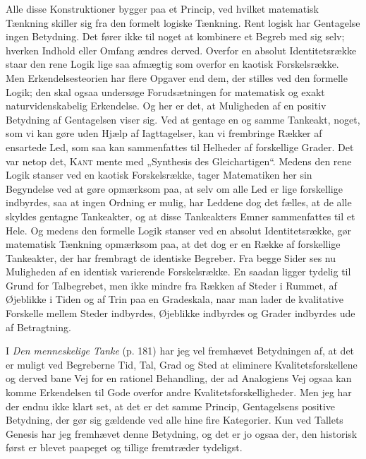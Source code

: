 \documentclass[12pt]{article}
\newcommand{\opage}[1]{\marginnote{\footnotesize\textit{[#1]}}}
\begin{document}
Alle disse Konstruktioner bygger paa et Princip, ved hvilket matematisk
Tænkning skiller sig fra den formelt logiske Tænkning. Rent logisk har
Gentagelse ingen Betydning. Det fører ikke til noget at kombinere et Begreb med
sig selv; hverken Indhold eller Omfang ændres derved. Overfor en absolut
Identitetsrække staar den rene Logik lige saa afmægtig som overfor en kaotisk
Forskelsrække. Men Erkendelsesteorien har flere Opgaver end dem, der stilles ved
den formelle Logik; den skal ogsaa undersøge Forudsætningen for matematisk og
exakt naturvidenskabelig Erkendelse. Og her er det, at Muligheden af en positiv
Betydning af Gentagelsen viser sig. Ved at gentage en og samme Tankeakt, noget,
som vi kan gøre uden Hjælp af Iagttagelser, kan vi frembringe Rækker af
ensartede Led, som saa kan sammenfattes til Helheder af forskellige Grader. Det
var netop det, \textsc{Kant} mente med „Synthesis des Gleichartigen“. Medens
den rene Logik stanser ved en kaotisk Forskelsrække, tager Matematiken her sin
Begyndelse ved at gøre opmærksom paa, at selv om alle Led er lige forskellige
indbyrdes, saa at ingen Ordning er mulig, har Leddene dog det fælles, at de
alle skyldes gentagne Tankeakter, og at disse Tankeakters Emner sammenfattes
til et Hele. Og medens den formelle Logik stanser ved en absolut
Identitetsrække, gør matematisk Tænkning opmærksom paa, at det dog er en Række
af forskellige Tankeakter, der har frembragt de identiske Begreber. Fra begge
Sider ses nu Muligheden af en identisk varierende Forskelsrække. En saadan
ligger tydelig til Grund for Talbegrebet, men ikke
\setcounter{footnote}{0}%
\opage{36}mindre fra Rækken af Steder i Rummet, af Øjeblikke i Tiden og af Trin
paa en Gradeskala, naar man lader de kvalitative Forskelle mellem Steder
indbyrdes, Øjeblikke indbyrdes og Grader indbyrdes ude af Betragtning.

I \textit{Den menneskelige Tanke} (p. 181) har jeg vel fremhævet Betydningen
af, at det er muligt ved Begreberne Tid, Tal, Grad og Sted at eliminere
Kvalitetsforskellene og derved bane Vej for en rationel Behandling, der ad
Analogiens Vej ogsaa kan komme Erkendelsen til Gode overfor andre
Kvalitetsforskelligheder. Men jeg har der endnu ikke klart set, at det er det
samme Princip, Gentagelsens positive Betydning, der gør sig gældende ved alle
hine fire Kategorier. Kun ved Tallets Genesis har jeg fremhævet denne
Betydning, og det er jo ogsaa der, den historisk først er blevet paapeget og
tillige fremtræder tydeligst.
\end{document}
